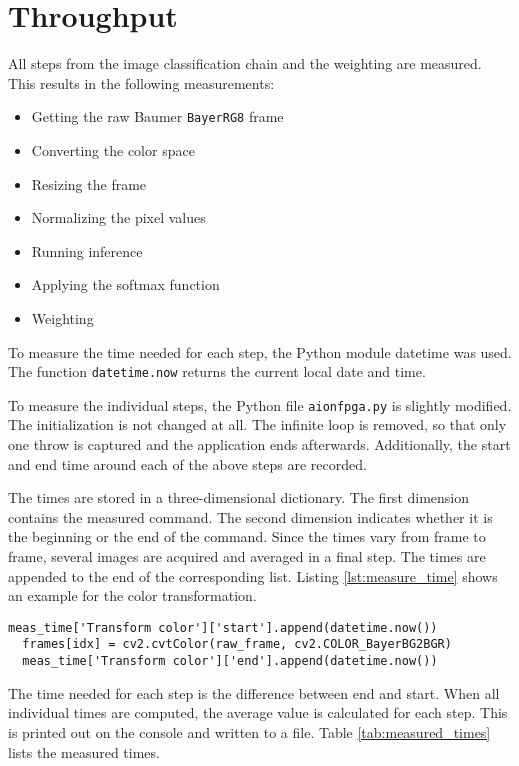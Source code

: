 \section{Throughput}
\label{sec:verification_and_benchmark:throughput}

All steps from the image classification chain and the weighting are measured.
This results in the following measurements:
\begin{itemize}
  \item Getting the raw Baumer \texttt{BayerRG8} frame
  \item Converting the color space
  \item Resizing the frame
  \item Normalizing the pixel values
  \item Running inference
  \item Applying the softmax function
  \item Weighting
\end{itemize}

To measure the time needed for each step, the Python module datetime was used.
The function \texttt{datetime.now} returns the current local date and time.

To measure the individual steps, the Python file \texttt{aionfpga.py} is slightly modified.
The initialization is not changed at all.
The infinite loop is removed, so that only one throw is captured and the application ends afterwards.
Additionally, the start and end time around each of the above steps are recorded.

The times are stored in a three-dimensional dictionary.
The first dimension contains the measured command.
The second dimension indicates whether it is the beginning or the end of the command.
Since the times vary from frame to frame, several images are acquired and averaged in a final step.
The times are appended to the end of the corresponding list.
Listing \ref{lst:measure_time} shows an example for the color transformation.

\begin{lstlisting}[style=python, caption={Measuring the required time for the color space conversion}, label=lst:measure_time]
  meas_time['Transform color']['start'].append(datetime.now())
  frames[idx] = cv2.cvtColor(raw_frame, cv2.COLOR_BayerBG2BGR)
  meas_time['Transform color']['end'].append(datetime.now())
\end{lstlisting}

The time needed for each step is the difference between end and start.
When all individual times are computed, the average value is calculated for each step.
This is printed out on the console and written to a file.
Table \ref{tab:measured_times} lists the measured times.

